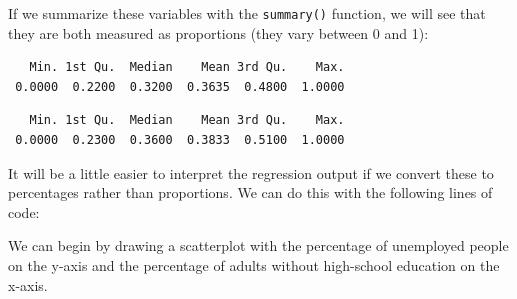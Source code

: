 \documentclass[]{article}
\newenvironment{Shaded}{\begin{snugshade}}{\end{snugshade}}
\newcommand{\DataTypeTok}[1]{\textcolor[rgb]{0.13,0.29,0.53}{#1}}
\newcommand{\DecValTok}[1]{\textcolor[rgb]{0.00,0.00,0.81}{#1}}
\newcommand{\KeywordTok}[1]{\textcolor[rgb]{0.13,0.29,0.53}{\textbf{#1}}}
\newcommand{\NormalTok}[1]{#1}
\newcommand{\OperatorTok}[1]{\textcolor[rgb]{0.81,0.36,0.00}{\textbf{#1}}}
\newcommand{\OtherTok}[1]{\textcolor[rgb]{0.56,0.35,0.01}{#1}}
\newcommand{\StringTok}[1]{\textcolor[rgb]{0.31,0.60,0.02}{#1}}
\begin{document}
If we summarize these variables with the \texttt{summary()} function, we will see that they are both measured as proportions (they vary between 0 and 1):

\begin{Shaded}
\end{Shaded}

\begin{verbatim}
   Min. 1st Qu.  Median    Mean 3rd Qu.    Max. 
 0.0000  0.2200  0.3200  0.3635  0.4800  1.0000 
\end{verbatim}

\begin{Shaded}
\end{Shaded}

\begin{verbatim}
   Min. 1st Qu.  Median    Mean 3rd Qu.    Max. 
 0.0000  0.2300  0.3600  0.3833  0.5100  1.0000 
\end{verbatim}

It will be a little easier to interpret the regression output if we convert these to percentages rather than proportions. We can do this with the following lines of code:

\begin{Shaded}
\end{Shaded}

We can begin by drawing a scatterplot with the percentage of unemployed people on the y-axis and the percentage of adults without high-school education on the x-axis.

\begin{Shaded}
\end{Shaded}
\end{document}
